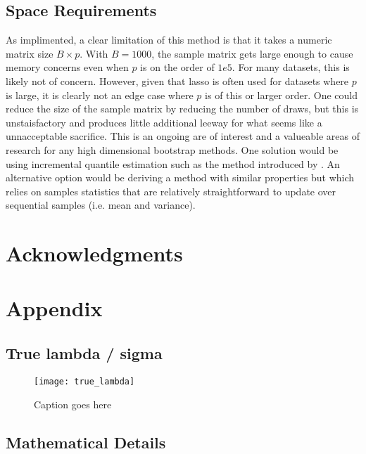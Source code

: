 \subsection{Space Requirements}

As implimented, a clear limitation of this method is that it takes a numeric matrix size $B \times p$. With $B = 1000$, the sample matrix gets large enough to cause memory concerns even when $p$ is on the order of $1e5$. For many datasets, this is likely not of concern. However, given that lasso is often used for datasets where $p$ is large, it is clearly not an edge case where $p$ is of this or larger order. One could reduce the size of the sample matrix by reducing the number of draws, but this is unstaisfactory and produces little additional leeway for what seems like a unnacceptable sacrifice. This is an ongoing are of interest and a valueable areas of research for any high dimensional bootstrap methods. One solution would be using incremental quantile estimation such as the method introduced by \cite{Tierney1983}. An alternative option would be deriving a method with similar properties but which relies on samples statistics that are relatively straightforward to update over sequential samples (i.e. mean and variance).

\section*{Acknowledgments}

\section*{Appendix}

\subsection{True lambda / sigma}

\begin{figure}
  \texttt{[image: true\_lambda]}
  \caption{\label{Fig:true_lambda} Caption goes here}
\end{figure}

\subsection{Mathematical Details}

